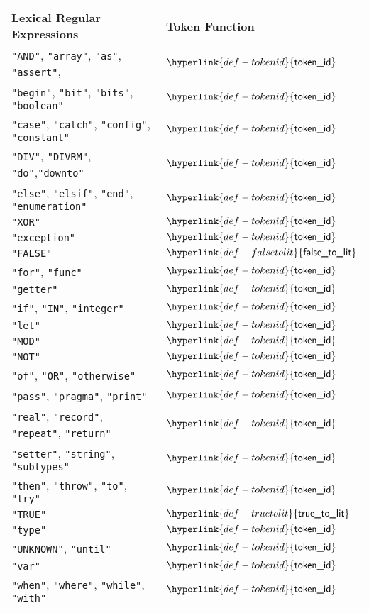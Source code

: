 \documentclass{book}
\newcommand\truetolit[0]{\hyperlink{def-truetolit}{\textsf{true\_to\_lit}}}
\newcommand\falsetolit[0]{\hyperlink{def-falsetolit}{\textsf{false\_to\_lit}}}
\newcommand\tokenid[0]{\hyperlink{def-tokenid}{\textsf{token\_id}}}
\begin{document}
\begin{center}
\begin{tabular}{ll}
\textbf{Lexical Regular Expressions} & \textbf{Token Function}\\
\hline
\texttt{"AND"}, \texttt{"array"}, \texttt{"as"}, \texttt{"assert"},      & $\tokenid$ \\
\texttt{"begin"}, \texttt{"bit"}, \texttt{"bits"}, \texttt{"boolean"}       & $\tokenid$ \\
\texttt{"case"}, \texttt{"catch"}, \texttt{"config"}, \texttt{"constant"}      & $\tokenid$ \\
\texttt{"DIV"}, \texttt{"DIVRM"}, \texttt{"do"},\texttt{"downto"}        & $\tokenid$ \\
\texttt{"else"}, \texttt{"elsif"}, \texttt{"end"}, \texttt{"enumeration"}   & $\tokenid$ \\
\texttt{"XOR"}           & $\tokenid$ \\
\texttt{"exception"}     & $\tokenid$ \\
\texttt{"FALSE"} & $\falsetolit$  \\
\texttt{"for"}, \texttt{"func"}          & $\tokenid$ \\
\texttt{"getter"}        & $\tokenid$ \\
\texttt{"if"}, \texttt{"IN"}, \texttt{"integer"}       & $\tokenid$ \\
\texttt{"let"}           & $\tokenid$ \\
\texttt{"MOD"}           & $\tokenid$ \\
\texttt{"NOT"}           & $\tokenid$ \\
\texttt{"of"},      \texttt{"OR"},      \texttt{"otherwise"}                  & $\tokenid$ \\
\texttt{"pass"},    \texttt{"pragma"},  \texttt{"print"}                      & $\tokenid$ \\
\texttt{"real"},    \texttt{"record"},  \texttt{"repeat"}, \texttt{"return"}  & $\tokenid$ \\
\texttt{"setter"},  \texttt{"string"},  \texttt{"subtypes"}                   & $\tokenid$ \\
\texttt{"then"},    \texttt{"throw"},   \texttt{"to"}, \texttt{"try"}         & $\tokenid$ \\
\texttt{"TRUE"}          & $\truetolit$ \\
\texttt{"type"}          & $\tokenid$ \\
\texttt{"UNKNOWN"}, \texttt{"until"}         & $\tokenid$ \\
\texttt{"var"}           & $\tokenid$ \\
\texttt{"when"}, \texttt{"where"}, \texttt{"while"}, \texttt{"with"}          & $\tokenid$ \\
\hline
\end{tabular}
\end{center}
\end{document}
